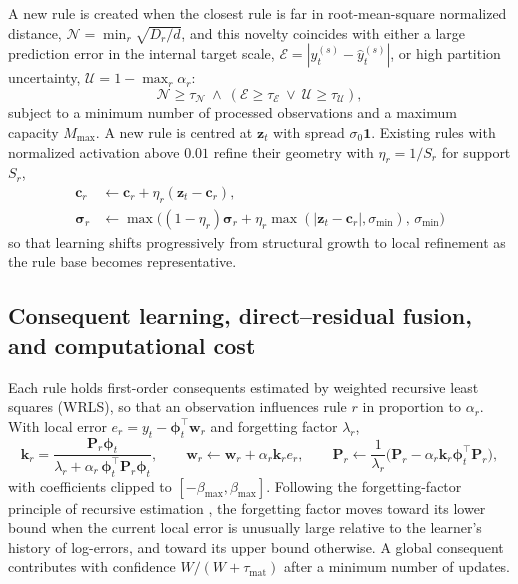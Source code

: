 \documentclass[preprint,12pt]{elsarticle}
\begin{document}
A new rule is created when the closest rule is far in root-mean-square normalized distance, $\mathcal{N}=\min_r\sqrt{D_r/d}$, and this novelty coincides with either a large prediction error in the internal target scale, $\mathcal{E}=|y^{(s)}_t-\widehat{y}^{(s)}_t|$, or high partition uncertainty, $\mathcal{U}=1-\max_r\alpha_r$:
\begin{equation}
\mathcal{N}\ge\tau_{\mathcal{N}} \ \land\ (\mathcal{E}\ge\tau_{\mathcal{E}} \ \lor\ \mathcal{U}\ge\tau_{\mathcal{U}}),
\label{eq:rule_growth_criterion}
\end{equation}
subject to a minimum number of processed observations and a maximum capacity $M_{\max}$. A new rule is centred at $\mathbf{z}_t$ with spread $\sigma_0\mathbf{1}$. Existing rules with normalized activation above $0.01$ refine their geometry with $\eta_r=1/S_r$ for support $S_r$,
\begin{equation}
\begin{aligned}
\mathbf{c}_r &\leftarrow \mathbf{c}_r + \eta_r(\mathbf{z}_t-\mathbf{c}_r),\\
\boldsymbol{\sigma}_r &\leftarrow \max\!\big((1-\eta_r)\boldsymbol{\sigma}_r + \eta_r\max(|\mathbf{z}_t-\mathbf{c}_r|,\sigma_{\min}),\,\sigma_{\min}\big)
\end{aligned}
\label{eq:geometry_update}
\end{equation}
so that learning shifts progressively from structural growth to local refinement as the rule base becomes representative.

\subsection{Consequent learning, direct--residual fusion, and computational cost}
\label{subsec:direct_residual}

Each rule holds first-order consequents estimated by weighted recursive least squares (WRLS), so that an observation influences rule $r$ in proportion to $\alpha_r$. With local error $e_r = y_t - \boldsymbol{\phi}_t^\top\mathbf{w}_r$ and forgetting factor $\lambda_r$,
\begin{equation}
\mathbf{k}_r = \frac{\mathbf{P}_r\boldsymbol{\phi}_t}{\lambda_r + \alpha_r\,\boldsymbol{\phi}_t^\top\mathbf{P}_r\boldsymbol{\phi}_t}, \qquad
\mathbf{w}_r \leftarrow \mathbf{w}_r + \alpha_r\mathbf{k}_r e_r, \qquad
\mathbf{P}_r \leftarrow \frac{1}{\lambda_r}\big(\mathbf{P}_r - \alpha_r\mathbf{k}_r\boldsymbol{\phi}_t^\top\mathbf{P}_r\big),
\label{eq:wrls_update}
\end{equation}
with coefficients clipped to $[-\beta_{\max},\beta_{\max}]$. Following the forgetting-factor principle of recursive estimation \citep{fortescue1981forgetting}, the forgetting factor moves toward its lower bound when the current local error is unusually large relative to the learner's history of log-errors, and toward its upper bound otherwise. A global consequent contributes with confidence $W/(W+\tau_{\mathrm{mat}})$ after a minimum number of updates.
\end{document}
